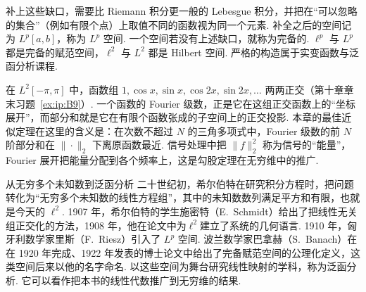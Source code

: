 \documentclass[lang=cn,10.5pt,scheme=chinese,toc=twocol,section,chinesefont=nofont,
twoside,citestyle=gb7714-2015,bibstyle=gb7714-2015]{elegantbook}
\DeclareRobustCommand{\textbf}[1]{{\lnsemiboldlatin\lnsemiboldcjk #1}}
\numberwithin{equation}{section}   %
\begin{document}
补上这些缺口，需要比 Riemann 积分更一般的 Lebesgue 积分，并把在“可以忽略的集合”（例如有限个点）上取值不同的函数视为同一个元素. 补全之后的空间记为 $L^p[a,b]$，称为 \textbf{$L^p$ 空间}. 一个空间若没有上述缺口，就称为\textbf{完备的}. $\ell^p$ 与 $L^p$ 都是完备的赋范空间，$\ell^2$ 与 $L^2$ 都是 Hilbert 空间. 严格的构造属于实变函数与泛函分析课程.

在 $L^2[-\pi,\pi]$ 中，函数组 $1,\cos x,\sin x,\cos2x,\sin2x,\ldots$ 两两正交（第十章章末习题~\ref{ex:ip:B9}）. 一个函数的 \textbf{Fourier 级数}，正是它在这组正交函数上的“坐标展开”，而部分和就是它在有限个函数张成的子空间上的正交投影. 本章的最佳近似定理在这里的含义是：在次数不超过 $N$ 的三角多项式中，Fourier 级数的前 $N$ 阶部分和在 $\|\cdot\|_2$ 下离原函数最近. 信号处理中把 $\|f\|_2^2$ 称为信号的“能量”，Fourier 展开把能量分配到各个频率上，这是勾股定理在无穷维中的推广.

\begin{historybox}{从无穷多个未知数到泛函分析}
  二十世纪初，希尔伯特在研究积分方程时，把问题转化为“无穷多个未知数的线性方程组”，其中的未知数数列满足平方和有限，也就是今天的 $\ell^2$. 1907 年，希尔伯特的学生施密特（E.~Schmidt）给出了把线性无关组正交化的方法，1908 年，他在论文\cite{schmidt1908aufloesung}中为$\ell^2$建立了系统的几何语言. 1910 年，匈牙利数学家里斯（F.~Riesz）引入了 $L^p$ 空间\cite{riesz1910untersuchungen}. 波兰数学家巴拿赫（S.~Banach）在在 1920 年完成、1922 年发表的博士论文\cite{banach1922operations}中给出了完备赋范空间的公理化定义，这类空间后来以他的名字命名. 以这些空间为舞台研究线性映射的学科，称为\textbf{泛函分析}. 它可以看作把本书的线性代数推广到无穷维的结果.
\end{historybox}
\end{document}
